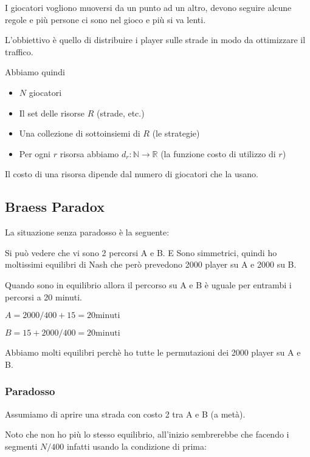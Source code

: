 \documentclass[10pt,a4paper]{report}
\begin{document}
        I giocatori vogliono muoversi da un punto ad un altro, devono seguire alcune regole e più persone ci sono nel gioco e più si va lenti.

        L'obbiettivo è quello di distribuire i player sulle strade in modo da ottimizzare il traffico.

        Abbiamo quindi
        \begin{itemize}
            \item $N$ giocatori
            \item Il set delle risorse $R$ (strade, etc.)
            \item Una collezione di sottoinsiemi di $R$ (le strategie)
            \item Per ogni $r$ risorsa abbiamo $d_r: \mathbb{N} \rightarrow \mathbb{R}$ (la funzione costo di utilizzo di $r$)
        \end{itemize}

        Il costo di una risorsa dipende dal numero di giocatori che la usano.

        \subsection{Braess Paradox}

        La situazione senza paradosso è la seguente:

        Si può vedere che vi sono 2 percorsi A e B. E Sono simmetrici, quindi ho moltissimi equilibri di Nash che però prevedono 2000 player su A e 2000 su B.

        Quando sono in equilibrio allora il percorso su A e B è uguale per entrambi i percorsi a 20 minuti.

        $A = 2000/400 + 15 = 20 \text{minuti}$

        $B = 15 + 2000/400 = 20 \text{minuti}$

        Abbiamo molti equilibri perchè ho tutte le permutazioni dei 2000 player su A e B.

        \subsubsection{Paradosso}

        Assumiamo di aprire una strada con costo 2 tra A e B (a metà).

        Noto che non ho più lo stesso equilibrio, all'inizio sembrerebbe che facendo i segmenti $N/400$ infatti usando la condizione di prima:
\end{document}
